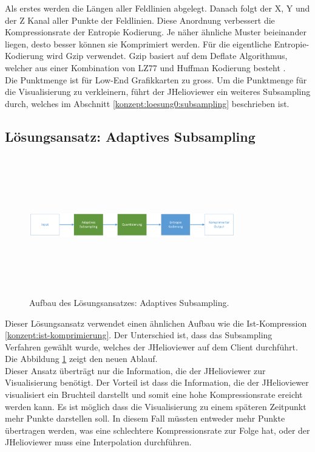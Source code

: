Als erstes werden die Längen aller Feldlinien abgelegt. Danach folgt der X, Y und der Z Kanal aller Punkte der Feldlinien. Diese Anordnung verbessert die Kompressionsrate der Entropie Kodierung. Je näher ähnliche Muster beieinander liegen, desto besser können sie Komprimiert werden. Für die eigentliche Entropie-Kodierung wird Gzip verwendet. Gzip basiert auf dem Deflate Algorithmus, welcher aus einer Kombination von LZ77 und Huffman Kodierung besteht \cite{wiki:gzip}.\\
Die Punktmenge ist für Low-End Grafikkarten zu gross. Um die Punktmenge für die Visualisierung zu verkleinern, führt der JHelioviewer ein weiteres Subsampling durch, welches im Abschnitt \ref{konzept:loesung0:subsampling} beschrieben ist.

\subsection{Lösungsansatz: Adaptives Subsampling} \label{konzept:loesung0}
\begin{figure}[!htbp]
	\center
	\includegraphics[width=0.8\textwidth,height=6cm,keepaspectratio]{./pictures/konzept/solution0/aufbau.png}
	\caption{Aufbau des Lösungsansatzes: Adaptives Subsampling.}
	\label{konzept:loesung0:aufbau:diagramm}
\end{figure} 
Dieser Lösungsansatz verwendet einen ähnlichen Aufbau wie die Ist-Kompression \ref{konzept:ist-komprimierung}. Der Unterschied ist, dass das Subsampling Verfahren gewählt wurde, welches der JHelioviewer auf dem Client durchführt. Die Abbildung \ref{konzept:loesung0:aufbau:diagramm} zeigt den neuen Ablauf.\\
Dieser Ansatz überträgt nur die Information, die der JHelioviewer zur Visualisierung benötigt. Der Vorteil ist dass die Information, die der JHelioviewer visualisiert ein Bruchteil darstellt und somit eine hohe Kompressionsrate ereicht werden kann. Es ist möglich dass die Visualisierung zu einem späteren Zeitpunkt mehr Punkte darstellen soll. In diesem Fall müssten entweder mehr Punkte übertragen werden, was eine schlechtere Kompressionsrate zur Folge hat, oder der JHelioviewer muss eine Interpolation durchführen. 

